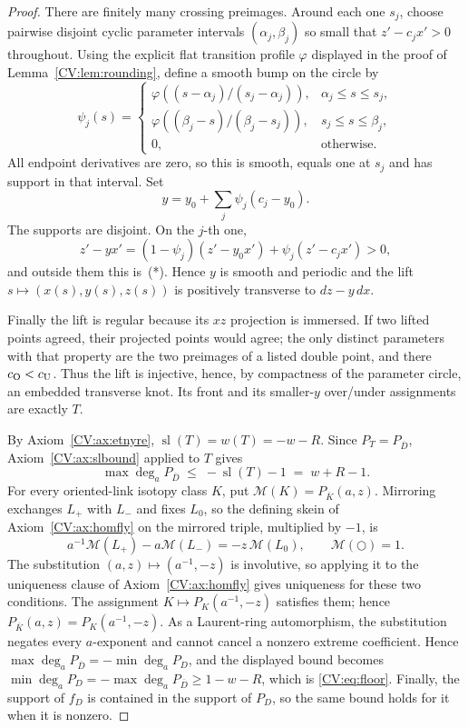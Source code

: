 \begin{proof}
There are finitely many crossing preimages.  Around each one $s_j$, choose
pairwise disjoint cyclic parameter intervals $(\alpha_j,\beta_j)$ so small that
$z'-c_jx'>0$ throughout.  Using the explicit flat transition profile
$\varphi$ displayed in the proof of Lemma~\ref{CV:lem:rounding}, define a smooth
bump on the circle by
\[
 \psi_j(s)=
 \begin{cases}
 \varphi\!\left((s-\alpha_j)/(s_j-\alpha_j)\right),&
       \alpha_j\le s\le s_j,\\
 \varphi\!\left((\beta_j-s)/(\beta_j-s_j)\right),&
       s_j\le s\le\beta_j,\\
 0,&\text{otherwise}.
 \end{cases}
\]
All endpoint derivatives are zero, so this is smooth, equals one at $s_j$ and
has support in that interval.  Set
\[
 y=y_0+\sum_j\psi_j(c_j-y_0).
\]
The supports are disjoint.  On the $j$-th one,
\[
 z'-yx'=(1-\psi_j)(z'-y_0x')+\psi_j(z'-c_jx')>0,
\]
and outside them this is~(*).  Hence $y$ is smooth and periodic and the lift
$s\mapsto(x(s),y(s),z(s))$ is positively transverse to $dz-y\,dx$.

Finally the lift is regular because its $xz$ projection is immersed.  If two
lifted points agreed, their projected points would agree; the only distinct
parameters with that property are the two preimages of a listed double point,
and there $c_{\rm O}<c_{\rm U}$.  Thus the lift is injective, hence, by
compactness of the parameter circle, an embedded transverse knot.  Its front
and its smaller-$y$ over/under assignments are exactly $T$.

By Axiom~\ref{CV:ax:etnyre}, $\operatorname{sl}(T)=w(T)=-w-R$. Since
$P_T=P_{\overline D}$, Axiom~\ref{CV:ax:slbound} applied to $T$ gives
\[
\max\deg_a P_{\overline D}\;\leq\;-\operatorname{sl}(T)-1\;=\;w+R-1 .
\]
For every oriented-link isotopy class $K$, put
$\mathcal M(K)=P_{\overline K}(a,z)$. Mirroring exchanges $L_+$ with $L_-$
and fixes $L_0$, so the defining skein of Axiom~\ref{CV:ax:homfly} on the
mirrored triple, multiplied by $-1$, is
\[
 a^{-1}\mathcal M(L_+)-a\mathcal M(L_-)=-z\,\mathcal M(L_0),
 \qquad \mathcal M(\bigcirc)=1.
\]
The substitution $(a,z)\mapsto(a^{-1},-z)$ is involutive, so applying it to
the uniqueness clause of Axiom~\ref{CV:ax:homfly} gives uniqueness for these two
conditions. The assignment $K\mapsto P_K(a^{-1},-z)$ satisfies them; hence
$P_{\overline K}(a,z)=P_K(a^{-1},-z)$. As a Laurent-ring automorphism, the
substitution negates every $a$-exponent and cannot cancel a nonzero extreme
coefficient. Hence
$\max\deg_a P_{\overline D}=-\min\deg_a P_D$, and the displayed bound becomes
$\min\deg_a P_D=-\max\deg_a P_{\overline D}\geq1-w-R$, which is
\eqref{CV:eq:floor}. Finally, the support of $f_D$ is contained in the support of
$P_D$, so the same bound holds for it when it is nonzero.


\end{proof}
